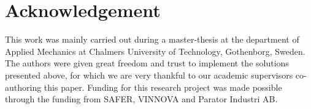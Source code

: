 \documentclass[root.tex]{subfiles}
\begin{document}
{\pagestyle{empty}}
\section{Acknowledgement}
\label{chap:Acknowledgement}
This work was mainly carried out during a master-thesis at the department of Applied Mechanics at Chalmers University of Technology, Gothenborg, Sweden\cite{franzreal}. The authors were given great freedom and trust to implement the solutions presented above, for which we are very thankful to our academic supervisors co-authoring this paper. Funding for this research project was made possible through the funding from SAFER\cite{safer}, VINNOVA\cite{vinnova} and Parator Industri AB\cite{paratorAB}.
\end{document}
